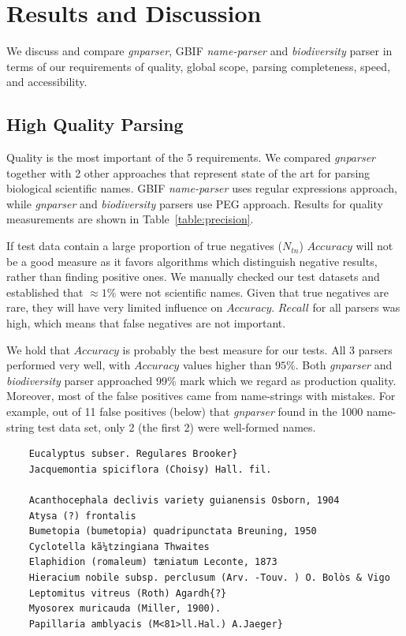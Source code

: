 \documentclass{bmcart}
\begin{document}
\section*{Results and Discussion}

We discuss and compare \textit{gnparser}, GBIF \textit{name-parser} and
\textit{biodiversity} parser in terms of our requirements of
quality, global scope, parsing completeness, speed, and accessibility. 


\subsection*{High Quality Parsing}

Quality is the most important of the 5 requirements.  We
compared \textit{gnparser} together with 2 other approaches that
represent state of the art for parsing biological scientific names. GBIF
\textit{name-parser} uses regular expressions approach, while \textit{gnparser}
and \textit{biodiversity} parsers use PEG approach.  Results for quality
measurements are shown in Table~\ref{table:precision}.

If test data contain a large proportion of true negatives ($N_{tn}$)
$Accuracy$ will not be a good measure as it favors algorithms which distinguish
negative results, rather than finding positive ones. We manually checked our test datasets and established that  $\approx1\%$ were not scientific names. Given that true negatives are rare, they will have very limited influence on $Accuracy$. $Recall$ for all parsers was high, which means that false negatives are not important. 

We hold that $Accuracy$ is probably the best measure
for our tests. All 3 parsers performed very well, with $Accuracy$
values higher than $95\%$. Both \textit{gnparser} and \textit{biodiversity}
parser approached 99\% mark which we regard as production quality. Moreover,
most of the false positives came from name-strings with mistakes. For example, out of 11 false positives (below) that \textit{gnparser} found in the 1000
name-string test data set, only 2 (the first 2) were well-formed names. 

\vspace{0.5cm}
\begin{verbatim} 
    Eucalyptus subser. Regulares Brooker}
    Jacquemontia spiciflora (Choisy) Hall. fil.

    Acanthocephala declivis variety guianensis Osborn, 1904
    Atysa (?) frontalis
    Bumetopia (bumetopia) quadripunctata Breuning, 1950
    Cyclotella kã¼tzingiana Thwaites
    Elaphidion (romaleum) tæniatum Leconte, 1873
    Hieracium nobile subsp. perclusum (Arv. -Touv. ) O. Bolòs & Vigo
    Leptomitus vitreus (Roth) Agardh{?}
    Myosorex muricauda (Miller, 1900).
    Papillaria amblyacis (M<81>ll.Hal.) A.Jaeger}
\end{verbatim}
\end{document}
